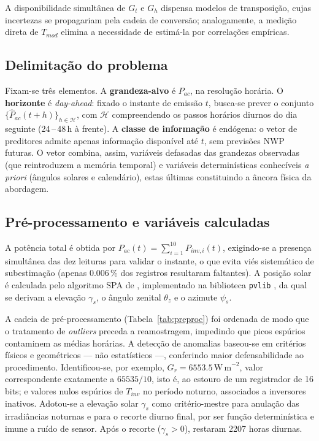 A disponibilidade simultânea de $G_t$ e $G_h$ dispensa modelos de transposição, cujas incertezas se propagariam pela cadeia de conversão; analogamente, a medição direta de $T_{mod}$ elimina a necessidade de estimá-la por correlações empíricas.

\subsection{Delimitação do problema}

Fixam-se três elementos. A \textbf{grandeza-alvo} é $P_{ac}$, na resolução horária. O \textbf{horizonte} é \textit{day-ahead}: fixado o instante de emissão $t$, busca-se prever o conjunto $\{\hat{P}_{ac}(t+h)\}_{h\in\mathcal{H}}$, com $\mathcal{H}$ compreendendo os passos horários diurnos do dia seguinte (24\,--\,48\,h à frente). A \textbf{classe de informação} é endógena: o vetor de preditores admite apenas informação disponível até $t$, sem previsões NWP futuras. O vetor combina, assim, variáveis defasadas das grandezas observadas (que reintroduzem a memória temporal) e variáveis determinísticas conhecíveis \textit{a priori} (ângulos solares e calendário), estas últimas constituindo a âncora física da abordagem.

\subsection{Pré-processamento e variáveis calculadas}

A potência total é obtida por $P_{ac}(t) = \sum_{i=1}^{10} P_{inv,i}(t)$, exigindo-se a presença simultânea das dez leituras para validar o instante, o que evita viés sistemático de subestimação (apenas 0.006\,\% dos registros resultaram faltantes). A posição solar é calculada pelo algoritmo SPA de \citet{reda2004}, implementado na biblioteca \texttt{pvlib} \citep{holmgren2018}, da qual se derivam a elevação $\gamma_s$, o ângulo zenital $\theta_z$ e o azimute $\psi_s$.

A cadeia de pré-processamento (Tabela~\ref{tab:preproc}) foi ordenada de modo que o tratamento de \textit{outliers} preceda a reamostragem, impedindo que picos espúrios contaminem as médias horárias. A detecção de anomalias baseou-se em critérios físicos e geométricos — não estatísticos —, conferindo maior defensabilidade ao procedimento. Identificou-se, por exemplo, $G_r = 6553.5\,\mathrm{W\,m}^{-2}$, valor correspondente exatamente a $65535/10$, isto é, ao estouro de um registrador de 16 bits; e valores nulos espúrios de $T_{inv}$ no período noturno, associados a inversores inativos. Adotou-se a elevação solar $\gamma_s$ como critério-mestre para anulação das irradiâncias noturnas e para o recorte diurno final, por ser função determinística e imune a ruído de sensor. Após o recorte ($\gamma_s > 0$), restaram 2207 horas diurnas.

